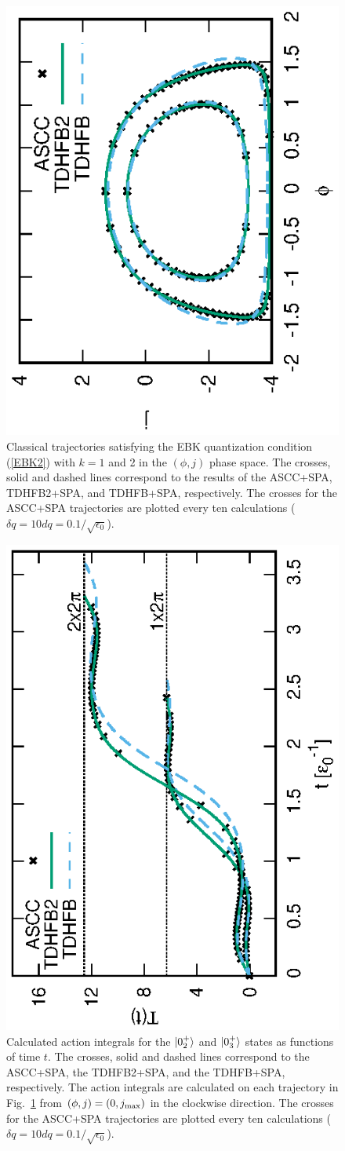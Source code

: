 \documentclass[11pt]{book} %
\begin{document}
\begin{figure}[tb]
 \begin{center}
   \includegraphics[height=0.45\textwidth,angle=-90]{images/N16X3p2trajectory.eps}
 \end{center}
\caption{Classical trajectories satisfying the EBK quantization condition
(\ref{EBK2}) with $k=1$ and 2 in the $(\phi,j)$ phase space.
The crosses, solid and dashed lines correspond to the results
of the ASCC+SPA, TDHFB2+SPA, and TDHFB+SPA, respectively.
The crosses for the ASCC+SPA trajectories are plotted every ten calculations
($\delta q = 10dq =0.1/\sqrt{\epsilon_0}$). 
}
\label{fig:N16_traj}
\end{figure}
\begin{figure}[tb]
 \begin{center}
   \includegraphics[height=0.5\textwidth,angle=-90]{images/N16X3p2action.eps}
 \end{center}
\caption{Calculated action integrals for the $\ket{0_2^+}$ and $\ket{0_3^+}$ states as functions of time $t$.
The crosses, solid and dashed lines correspond to the ASCC+SPA,
the TDHFB2+SPA, and the TDHFB+SPA, respectively. 
The action integrals are calculated on each trajectory in Fig.~\ref{fig:N16_traj}
from $(\phi,j)=(0,j_{\rm max})$ in the clockwise direction.
The crosses for the ASCC+SPA trajectories are plotted every ten calculations
($\delta q = 10dq =0.1/\sqrt{\epsilon_0}$). 
}
\label{fig:N16_tau}
\end{figure}
\end{document}

